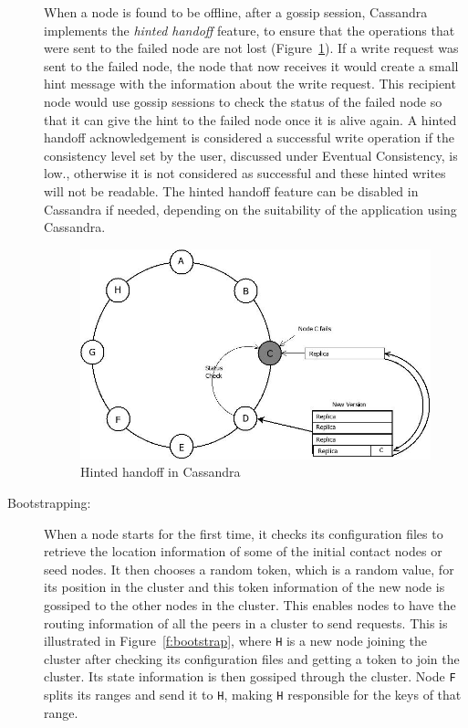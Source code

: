 \begin{description}
When a node is found to be offline, after a gossip session, Cassandra implements
the \textit{hinted handoff} feature, to ensure that the operations that were
sent to the failed node are not lost (Figure~\ref{f:hinted handoff}). If a write request
was sent to the failed node, the node that now receives it would create a small
hint message with the information about the write request. This recipient node would use gossip
sessions to check the status of the failed node so that it can give the hint to
the failed node once it is alive again. A hinted handoff acknowledgement is
considered a successful write operation if the consistency level set by the
user, discussed under Eventual Consistency, is low., otherwise it is not
considered as successful and these hinted writes will not be readable. The hinted
handoff feature can be disabled in Cassandra if needed, depending on the suitability of the application using Cassandra.
\begin{figure}[h] 
	\centering
	\includegraphics[width=.6\textwidth]{./figure/Solutions/Hinted-handoff.png}
	\caption{Hinted handoff in Cassandra}\label{f:hinted handoff}
\end{figure}

\item[Bootstrapping:] When a node starts for the first time, it checks its
configuration files to retrieve the location information of some of the
initial contact nodes or seed nodes.  It then chooses a random token, which is a
random value, for its position in the cluster and this token information of the
new node is gossiped to the other nodes in the cluster. This enables nodes to
have the routing information of all the peers in a cluster to send requests.
This is illustrated in Figure~\ref{f:bootstrap}, where \texttt{H} is a new node
joining the cluster after checking its configuration files and getting a token to join
the cluster. Its state information is then gossiped through the cluster. Node
\texttt{F} splits its ranges and send it to \texttt{H}, making \texttt{H}
responsible for the keys of that range.


\end{description}
